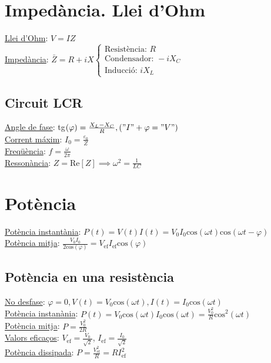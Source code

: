 \documentclass[12pt]{article}
\begin{document}
\begin{multicols}{5}
\section{Impedància. Llei d'Ohm}

\underline{Llei d'Ohm}: $V = IZ$ \\
\underline{Impedància}: $\bar{Z} = R + iX \begin{cases} \text{Resistència: } R \\ \text{Condensador: } -iX_C \\ \text{Inducció: } iX_L \end{cases}$

\subsection{Circuit LCR}

\underline{Angle de fase}: tg$(\varphi)=\frac{X_L-X_C}{R}, ("I" + \varphi = "V")$ \\
\underline{Corrent máxim}: $I_0 = \frac{\varepsilon_0}{Z}$ \\
\underline{Freqüència}: $f = \frac{\omega}{2\pi}$ \\
\underline{Ressonància}: $Z = \text{Re}[Z] \implies \omega^2 = \frac{1}{LC}$

\section{Potència}

\underline{Potència instantània}: $P(t) = V(t)I(t) = V_0I_0\text{cos}(\omega t)\text{cos}(\omega t - \varphi)$ \\
\underline{Potència mitja}: $\frac{V_0I_0}{2\text{cos}(\varphi)} = V_\text{ef}I_\text{ef}\text{cos}(\varphi)$

\subsection{Potència en una resistència}

\underline{No desfase}: $\varphi = 0, V(t) = V_0\text{cos}(\omega t), I(t) = I_0\text{cos}(\omega t)$ \\
\underline{Potència instanània}: $P(t) = V_0\text{cos}(\omega t)I_0\text{cos}(\omega t) = \frac{V_0^2}{R}\text{cos}^2(\omega t)$ \\
\underline{Potència mitja}: $P = \frac{V_0^2}{2R}$ \\
\underline{Valors eficaços}: $V_{\text{ef}} = \frac{V_0}{\sqrt{2}}$, $I_{\text{ef}} = \frac{I_0}{\sqrt{2}}$ \\
\underline{Potència dissipada}: $P = \frac{V_{\text{ef}}^2}{R} = RI_{\text{ef}}^2$


\end{multicols}
\end{document}
